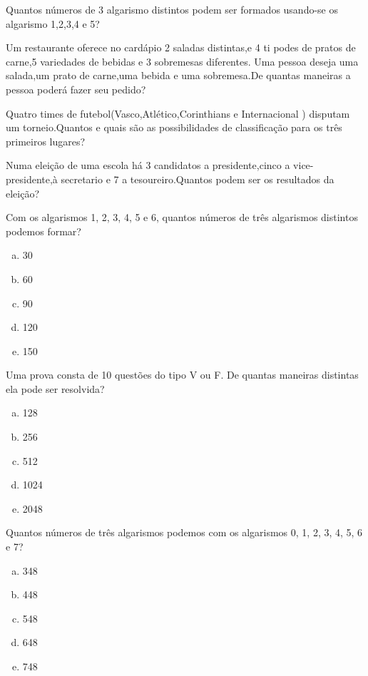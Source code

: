 		\item Quantos números de 3 algarismo distintos podem ser formados usando-se os algarismo 1,2,3,4 e 5?

		\item Um restaurante oferece no cardápio 2 saladas distintas,e 4 ti podes de pratos de carne,5 variedades de bebidas e 3 sobremesas diferentes. Uma pessoa deseja uma salada,um prato de carne,uma bebida e uma sobremesa.De quantas maneiras a pessoa poderá fazer seu pedido?
		
		\item Quatro times de futebol(Vasco,Atlético,Corinthians e Internacional ) disputam um torneio.Quantos e quais são as possibilidades de classificação para os três primeiros lugares?
		
		\item Numa eleição de uma escola há 3 candidatos a presidente,cinco a vice-presidente,à secretario e 7 a tesoureiro.Quantos podem ser os resultados da eleição?
		
		 \item Com os algarismos 1, 2, 3, 4, 5 e 6, quantos números de três algarismos distintos podemos formar?
		 \begin{multicols}{5}
		 \begin{enumerate}[a)]
		 	\item 30
		 	\item 60
		 	\item 90
		 	\item 120
		 	\item 150
		 \end{enumerate}
		 \end{multicols}

		\item Uma prova consta de 10 questões do tipo V ou F. De quantas maneiras distintas ela pode ser resolvida?
		\begin{multicols}{5}
		 \begin{enumerate}[a)]
		 	\item 128
		 	\item 256
		 	\item 512
		 	\item 1024
		 	\item 2048
		 \end{enumerate}
		 \end{multicols}

		\item Quantos números de três algarismos podemos com os algarismos 0, 1, 2, 3, 4, 5, 6 e 7?
		\begin{multicols}{5}
		 \begin{enumerate}[a)]
		 	\item 348
		 	\item 448
		 	\item 548
		 	\item 648
		 	\item 748
		 \end{enumerate}
		 \end{multicols}

